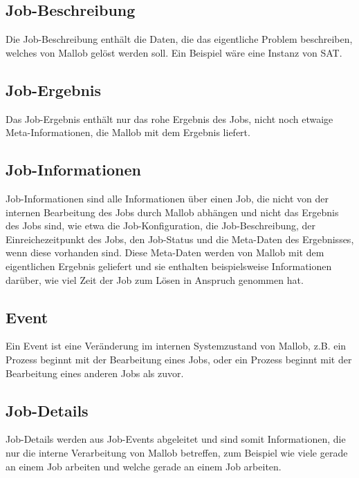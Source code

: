     
\subsection{Job-Beschreibung}
\label{B:Job-Beschreibung}
Die Job-Beschreibung enthält die Daten, die das eigentliche Problem beschreiben, welches von \gls{Mallob} gelöst werden soll. Ein Beispiel wäre eine Instanz von \gls{SAT}.


\subsection{Job-Ergebnis}
\label{B:Job-Ergebnis}
Das Job-Ergebnis enthält nur das rohe Ergebnis des Jobs, nicht noch etwaige Meta-Informationen, die \gls{Mallob} mit dem Ergebnis liefert.

\subsection{Job-Informationen}
\label{B:Job-Informationen}
Job-Informationen sind alle Informationen über einen Job, die nicht von der internen Bearbeitung des Jobs durch \gls{Mallob} abhängen und nicht das Ergebnis des Jobs sind, wie etwa die Job-Konfiguration, die Job-Beschreibung, der Einreichezeitpunkt des Jobs, den Job-Status und die Meta-Daten des Ergebnisses, wenn diese vorhanden sind. Diese Meta-Daten werden von \gls{Mallob} mit dem eigentlichen Ergebnis geliefert und sie enthalten beispielsweise Informationen darüber, wie viel Zeit der Job zum Lösen in Anspruch genommen hat.

\subsection{Event}
\label{B:Event}
Ein Event ist eine Veränderung im internen Systemzustand von \gls{Mallob}, z.B. ein \gls{Prozess} beginnt mit der Bearbeitung eines Jobs, oder ein \gls{Prozess} beginnt mit der Bearbeitung eines anderen Jobs als zuvor. 

\subsection{Job-Details}
\label{B:Job-Details}
Job-Details werden aus Job-Events abgeleitet und sind somit Informationen, die nur die interne Verarbeitung von \gls{Mallob} betreffen, zum Beispiel wie viele  gerade an einem Job arbeiten und welche  gerade an einem Job arbeiten. 

